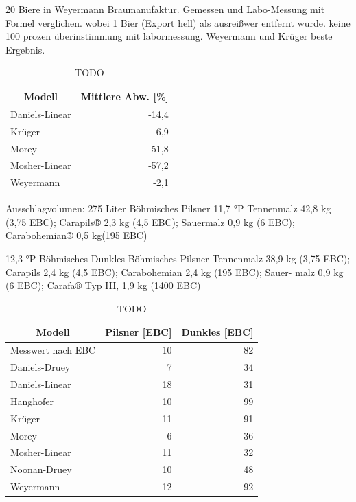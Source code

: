 \documentclass[a4paper,parskip=half]{scrartcl}
\begin{document}
\parencite{KrausWeyermann2021b}
20 Biere in Weyermann Braumanufaktur. Gemessen und Labo-Messung mit Formel verglichen.
wobei 1 Bier (Export hell) als ausreißwer entfernt wurde.
keine 100 prozen überinstimmung mit labormessung.
Weyermann und Krüger beste Ergebnis.

\begin{table}[H]
\centering
\begin{tabular}{lr}
\toprule
\multicolumn{1}{c}{\textbf{Modell}} & \multicolumn{1}{c}{\textbf{Mittlere Abw. [\%]}} \\
\midrule
Daniels-Linear & -14,4 \\
Krüger & 6,9 \\
Morey & -51,8 \\
Mosher-Linear & -57,2 \\
Weyermann & -2,1 \\
\bottomrule
\end{tabular}
\caption{TODO \parencite{KrausWeyermann2021b}}
\label{table:modelcompareall}
\end{table}

Ausschlagvolumen: 275 Liter
Böhmisches Pilsner
11,7 °P
Tennenmalz
42,8 kg (3,75 EBC); Carapils® 2,3 kg
(4,5 EBC); Sauermalz 0,9 kg (6 EBC);
Carabohemian® 0,5 kg(195 EBC)

12,3 °P Böhmisches Dunkles
Böhmisches Pilsner Tennenmalz 38,9
kg (3,75 EBC); Carapils 2,4 kg (4,5 EBC);
Carabohemian 2,4 kg (195 EBC); Sauer-
malz 0,9 kg (6 EBC); Carafa® Typ III, 1,9
kg (1400 EBC)

\begin{table}[H]
\centering
\begin{tabular}{lrr}
\toprule
\multicolumn{1}{c}{\textbf{Modell}} & \multicolumn{1}{c}{\textbf{Pilsner [EBC]}} & \multicolumn{1}{c}{\textbf{Dunkles [EBC]}} \\
\midrule
Messwert nach EBC & 10 & 82 \\
Daniels-Druey & 7 & 34 \\
Daniels-Linear & 18 & 31 \\
Hanghofer & 10 & 99 \\
Krüger & 11 & 91 \\
Morey & 6 & 36 \\
Mosher-Linear & 11 & 32 \\
Noonan-Druey & 10 & 48 \\
Weyermann & 12 & 92 \\
\bottomrule
\end{tabular}
\caption{TODO \textcite{KrausWeyermann2021c}}
\label{table:modelcompare}
\end{table}
\end{document}
